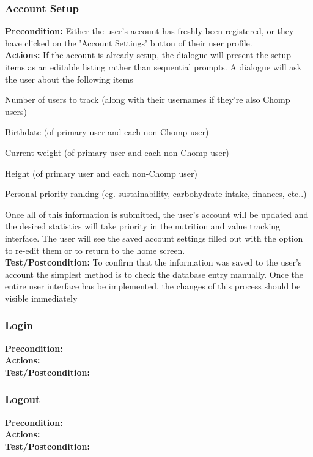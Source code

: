\documentclass[a4paper,12pt]{article}
\begin{document}
\subsubsection{Account Setup}
\textbf{Precondition:} Either the user's account has freshly been registered, or they have clicked on the 'Account Settings' button of their user profile.\\
\textbf{Actions:} If the account is already setup, the dialogue will present the setup items as an editable listing rather than sequential prompts.  A dialogue will ask the user about the following items\begin{list}{•}{•}
\item Number of users to track (along with their usernames if they're also Chomp users)
\item Birthdate (of primary user and each non-Chomp user)
\item Current weight (of primary user and each non-Chomp user)
\item Height (of primary user and each non-Chomp user)
\item Personal priority ranking (eg. sustainability, carbohydrate intake, finances, etc..)
\end{list}
Once all of this information is submitted, the user's account will be updated and the desired statistics will take priority in the nutrition and value tracking interface.  The user will see the saved account settings filled out with the option to re-edit them or to return to the home screen.\\
\textbf{Test/Postcondition:} To confirm that the information was saved to the user's account the simplest method is to check the database entry manually.  Once the entire user interface has be implemented, the changes of this process should be visible immediately 
\subsubsection{Login}
\textbf{Precondition:}\\
\textbf{Actions:}\\
\textbf{Test/Postcondition:}
\subsubsection{Logout}
\textbf{Precondition:}\\
\textbf{Actions:}\\
\textbf{Test/Postcondition:}
\end{document}

